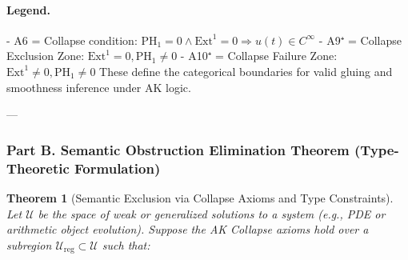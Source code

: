 \documentclass[11pt]{article}
\newtheorem{theorem}{Theorem}[section]
\begin{document}
\begin{axiom}
\begin{axiom}
{{\begin{center}
\end{center}

\paragraph{Legend.}
- A6 = Collapse condition: \( \mathrm{PH}_1 = 0 \wedge \mathrm{Ext}^1 = 0 \Rightarrow u(t) \in C^\infty \)
- A9⁺ = Collapse Exclusion Zone: \( \mathrm{Ext}^1 = 0, \mathrm{PH}_1 \neq 0 \)  
- A10⁺ = Collapse Failure Zone: \( \mathrm{Ext}^1 \neq 0, \mathrm{PH}_1 \neq 0 \)  
These define the categorical boundaries for valid gluing and smoothness inference under AK logic.

---

\subsubsection*{Part B. Semantic Obstruction Elimination Theorem (Type-Theoretic Formulation)}

\begin{theorem}[Semantic Exclusion via Collapse Axioms and Type Constraints]
Let \( \mathcal{U} \) be the space of weak or generalized solutions to a system (e.g., PDE or arithmetic object evolution).  
Suppose the AK Collapse axioms hold over a subregion \( \mathcal{U}_{\mathrm{reg}} \subset \mathcal{U} \) such that:


\end{theorem}}}
\end{axiom}
\end{axiom}
\end{document}
